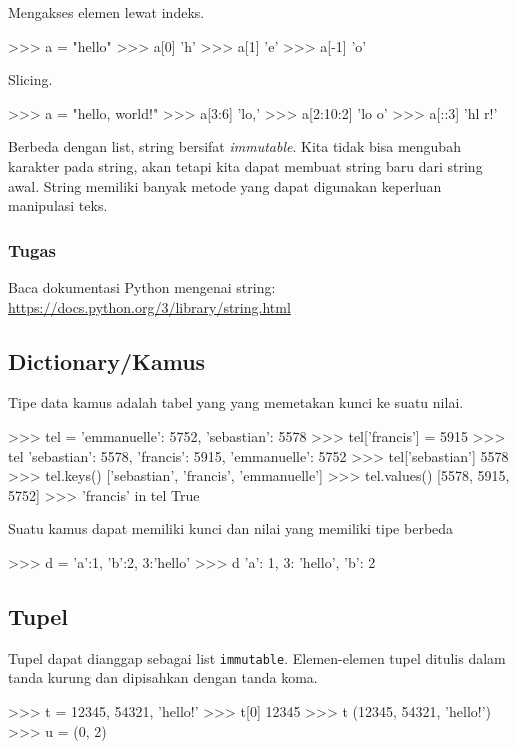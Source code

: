 \documentclass[a4paper,11pt]{extarticle}
\begin{document}
Mengakses elemen lewat indeks.
\begin{pyconcode}
>>> a = "hello"
>>> a[0]
'h'
>>> a[1]
'e'
>>> a[-1]
'o'
\end{pyconcode}

Slicing.
\begin{pyconcode}
>>> a = "hello, world!"
>>> a[3:6]
'lo,'
>>> a[2:10:2]
'lo o'
>>> a[::3]
'hl r!'
\end{pyconcode}

Berbeda dengan list, string bersifat \textit{immutable}.
Kita tidak bisa mengubah karakter pada string, akan tetapi kita dapat
membuat string baru dari string awal.
String memiliki banyak metode yang dapat digunakan keperluan
manipulasi teks.

\subsubsection*{Tugas}

Baca dokumentasi Python mengenai string:
\url{https://docs.python.org/3/library/string.html}



\subsection{Dictionary/Kamus}

Tipe data kamus adalah tabel yang yang memetakan kunci ke suatu nilai.
\begin{pyconcode}
>>> tel = {'emmanuelle': 5752, 'sebastian': 5578}
>>> tel['francis'] = 5915 
>>> tel
{'sebastian': 5578, 'francis': 5915, 'emmanuelle': 5752}
>>> tel['sebastian']
5578
>>> tel.keys()
['sebastian', 'francis', 'emmanuelle']
>>> tel.values()
[5578, 5915, 5752]
>>> 'francis' in tel
True
\end{pyconcode}

Suatu kamus dapat memiliki kunci dan nilai yang memiliki tipe berbeda
\begin{pyconcode}
>>> d = {'a':1, 'b':2, 3:'hello'}
>>> d
{'a': 1, 3: 'hello', 'b': 2}
\end{pyconcode}

\subsection{Tupel}
Tupel dapat dianggap sebagai list \texttt{immutable}.
Elemen-elemen tupel ditulis dalam tanda kurung dan dipisahkan dengan
tanda koma.
\begin{pyconcode}
>>> t = 12345, 54321, 'hello!'
>>> t[0]
12345
>>> t
(12345, 54321, 'hello!')
>>> u = (0, 2)
\end{pyconcode}
\end{document}
